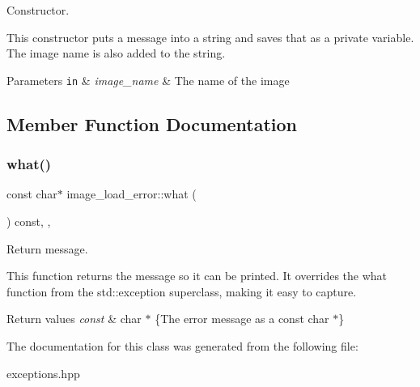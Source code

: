 Constructor. 

This constructor puts a message into a string and saves that as a private variable. The image name is also added to the string.


\begin{DoxyParams}[1]{Parameters}
\mbox{\tt in}  & {\em image\+\_\+name} & The name of the image \\
\hline
\end{DoxyParams}


\subsection{Member Function Documentation}
\mbox{\label{classimage__load__error_ab73fa8f110ff313005a7bb0ed66fd880}} 
\subsubsection{\texorpdfstring{what()}{what()}}
{\footnotesize\ttfamily const char$\ast$ image\+\_\+load\+\_\+error\+::what (\begin{DoxyParamCaption}{ }\end{DoxyParamCaption}) const\hspace{0.3cm}{\ttfamily [inline]}, {\ttfamily [override]}, {\ttfamily [noexcept]}}



Return message. 

This function returns the message so it can be printed. It overrides the what function from the std\+::exception superclass, making it easy to capture.


\begin{DoxyRetVals}{Return values}
{\em const} & char $\ast$ \{The error message as a const char $\ast$\} \\
\hline
\end{DoxyRetVals}


The documentation for this class was generated from the following file\+:\begin{DoxyCompactItemize}
\item 
exceptions.\+hpp\end{DoxyCompactItemize}
